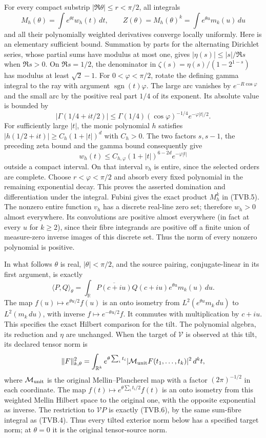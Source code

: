 \documentclass[11pt]{article}
\newcommand{\R}{\mathbb R}
\begin{document}
For every compact substrip $|\Re\theta|\le r<\pi/2$, all integrals
\[
 M_h(\theta)=\int e^{\theta t}w_h(t)\,dt,\qquad
 Z(\theta)=M_h(\theta)^k=\int e^{\theta u}m_k(u)\,du
 \tag{TVB.5}
\]
and all their polynomially weighted derivatives converge locally
uniformly. Here is an elementary sufficient bound. Summation by parts
for the alternating Dirichlet series, whose partial sums have modulus
at most one, gives $|\eta(s)|\le |s|/\Re s$ when $\Re s>0$.
On $\Re s=1/2$, the denominator in
$\zeta(s)=\eta(s)/(1-2^{1-s})$ has modulus at least $\sqrt2-1$.
For $0<\varphi<\pi/2$, rotate the defining gamma integral to the
ray with argument $\operatorname{sgn}(t)\varphi$. The large arc
vanishes by $e^{-R\cos\varphi}$ and the small arc by the positive
real part $1/4$ of its exponent. Its absolute value is bounded by
\[
 |\Gamma(1/4+it/2)|
 \le\Gamma(1/4)(\cos\varphi)^{-1/4}e^{-\varphi|t|/2}.
\]
For sufficiently large $|t|$, the monic polynomial $h$ satisfies
$|h(1/2+it)|\ge C_h(1+|t|)^d$ with $C_h>0$.
The two factors $s,s-1$, the preceding zeta bound and the gamma
bound consequently give
\[
 w_h(t)\le C_{h,\varphi}(1+|t|)^{6-2d}e^{-\varphi|t|}
\]
outside a compact interval. On that interval $v_h$ is entire, since
the selected orders are complete. Choose $r<\varphi<\pi/2$ and
absorb every fixed polynomial in the remaining exponential decay.
This proves the asserted domination and differentiation under the
integral. Fubini gives the exact product $M_h^k$ in (TVB.5).
The nonzero entire function $v_h$ has a discrete real-line zero set;
therefore $w_h>0$ almost everywhere. Its convolutions are positive
almost everywhere (in fact at every $u$ for $k\ge2$), since their
fibre integrands are positive off a finite union of measure-zero
inverse images of this discrete set. Thus the norm of every nonzero
polynomial is positive.

In what follows $\theta$ is real, $|\theta|<\pi/2$, and the source
pairing, conjugate-linear in its first argument, is exactly
\[
 \langle P,Q\rangle_\theta
 =\int_\R\overline{P(c+iu)}Q(c+iu)e^{\theta u}m_k(u)\,du.
 \tag{TVB.6}
\]
The map $f(u)\mapsto e^{\theta u/2}f(u)$ is an onto isometry from
$L^2(e^{\theta u}m_k\,du)$ to $L^2(m_k\,du)$, with inverse
$f\mapsto e^{-\theta u/2}f$. It commutes with multiplication by
$c+iu$. This specifies the exact Hilbert comparison for the tilt.
The polynomial algebra, its reduction and $\eta$ are unchanged.
When the target of $\mathcal V$ is observed at this tilt, its declared
tensor norm is
\[
 \|F\|_{k,\theta}^2=\int_{\R^k}
 e^{\theta\sum_i t_i}|\mathcal M_{\rm unit}F(t_1,\ldots,t_k)|^2\,d^kt,
\]
where $\mathcal M_{\rm unit}$ is the original Mellin--Plancherel map
with a factor $(2\pi)^{-1/2}$ in each coordinate. The map
$f(t)\mapsto e^{\theta\sum_i t_i/2}f(t)$ is an onto isometry from
this weighted Mellin Hilbert space to the original one, with the
opposite exponential as inverse. The restriction to $\mathcal V P$
is exactly (TVB.6), by the same sum-fibre integral as (TVB.4).
Thus every tilted exterior norm below has a specified target norm;
at $\theta=0$ it is the original tensor-source norm.
\end{document}
